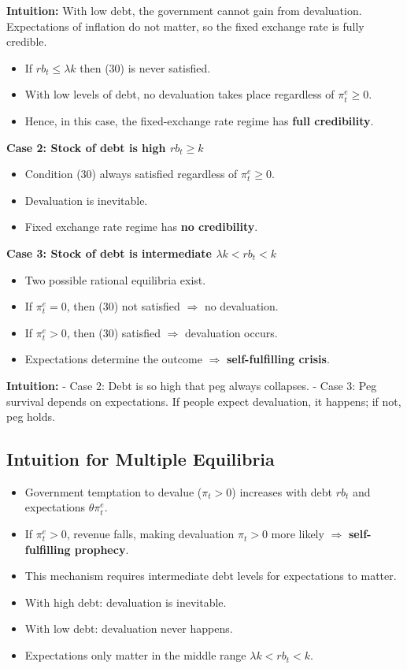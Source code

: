 \documentclass[12pt]{article}
\begin{document}
\textbf{Intuition:} With low debt, the government cannot gain from devaluation. Expectations of inflation do not matter, so the fixed exchange rate is fully credible.

\begin{itemize}
    \item If $rb_t \leq \lambda k$ then (30) is never satisfied. 
    \item With low levels of debt, no devaluation takes place regardless of $\pi_t^e \geq 0$. 
    \item Hence, in this case, the fixed-exchange rate regime has \textbf{full credibility}.
\end{itemize}

\textbf{Case 2: Stock of debt is high $rb_t \geq k$}
\begin{itemize}
    \item Condition (30) always satisfied regardless of $\pi_t^e \geq 0$.
    \item Devaluation is inevitable.
    \item Fixed exchange rate regime has \textbf{no credibility}.
\end{itemize}

\textbf{Case 3: Stock of debt is intermediate $\lambda k < rb_t < k$}
\begin{itemize}
    \item Two possible rational equilibria exist.
    \item If $\pi_t^e = 0$, then (30) not satisfied $\Rightarrow$ no devaluation.
    \item If $\pi_t^e > 0$, then (30) satisfied $\Rightarrow$ devaluation occurs.
    \item Expectations determine the outcome $\Rightarrow$ \textbf{self-fulfilling crisis}.
\end{itemize}

\textbf{Intuition:}  
- Case 2: Debt is so high that peg always collapses.  
- Case 3: Peg survival depends on expectations. If people expect devaluation, it happens; if not, peg holds.

\subsection*{Intuition for Multiple Equilibria}

\begin{itemize}
    \item Government temptation to devalue ($\pi_t > 0$) increases with debt $rb_t$ and expectations $\theta \pi_t^e$.
    \item If $\pi_t^e > 0$, revenue falls, making devaluation $\pi_t > 0$ more likely $\Rightarrow$ \textbf{self-fulfilling prophecy}.
    \item This mechanism requires intermediate debt levels for expectations to matter.
    \item With high debt: devaluation is inevitable.  
    \item With low debt: devaluation never happens.  
    \item Expectations only matter in the middle range $\lambda k < rb_t < k$.
\end{itemize}
\end{document}
